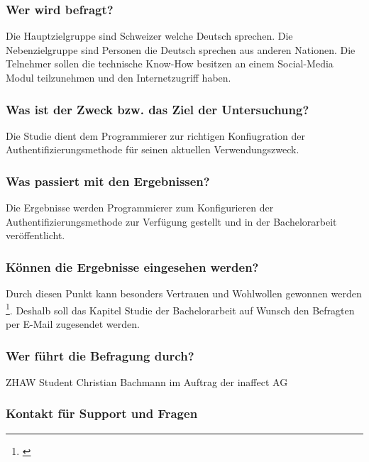 \subsubsection{Wer wird befragt?}\label{wer-wird-befragt}

Die Hauptzielgruppe sind Schweizer welche Deutsch sprechen. Die
Nebenzielgruppe sind Personen die Deutsch sprechen aus anderen Nationen.
Die Telnehmer sollen die technische Know-How besitzen an einem
Social-Media Modul teilzunehmen und den Internetzugriff haben.

\subsubsection{Was ist der Zweck bzw. das Ziel der
Untersuchung?}\label{was-ist-der-zweck-bzw.-das-ziel-der-untersuchung}

Die Studie dient dem Programmierer zur richtigen Konfiugration der
Authentifizierungsmethode für seinen aktuellen Verwendungszweck.

\subsubsection{Was passiert mit den
Ergebnissen?}\label{was-passiert-mit-den-ergebnissen}

Die Ergebnisse werden Programmierer zum Konfigurieren der
Authentifizierungsmethode zur Verfügung gestellt und in der
Bachelorarbeit veröffentlicht.

\subsubsection{Können die Ergebnisse eingesehen
werden?}\label{kuxf6nnen-die-ergebnisse-eingesehen-werden}

Durch diesen Punkt kann besonders Vertrauen und Wohlwollen gewonnen
werden \footnote{\autocite{fragebogen}}. Deshalb soll das Kapitel Studie
der Bachelorarbeit auf Wunsch den Befragten per E-Mail zugesendet
werden.

\subsubsection{Wer führt die Befragung
durch?}\label{wer-fuxfchrt-die-befragung-durch}

ZHAW Student Christian Bachmann im Auftrag der inaffect AG

\subsubsection{Kontakt für Support und
Fragen}\label{kontakt-fuxfcr-support-und-fragen}

